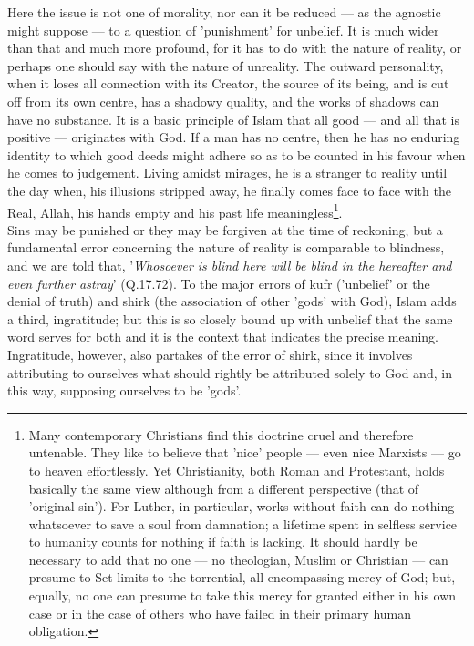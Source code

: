 \documentclass[11pt, b5paper, twoside]{book}
\begin{document}
Here the issue is not one of morality, nor can it be reduced --- as the agnostic might suppose --- to a 
question of 'punishment' for unbelief. It is much wider than that and much more profound, for it has 
to do with the nature of reality, or perhaps one should say with the nature of unreality. The outward 
personality, when it loses all connection with its Creator, the source of its being, and is cut off 
from its own centre, has a shadowy quality, and the works of shadows can have no substance. It is a 
basic principle of Islam that all good --- and all that is positive --- originates with God. If a man has 
no centre, then he has no enduring identity to which good deeds might adhere so as to be counted in 
his favour when he comes to judgement. Living amidst mirages, he is a stranger to reality until the 
day when, his illusions stripped away, he finally comes face to face with the Real, Allah, his hands 
empty and his past life meaningless\footnote{Many contemporary Christians find this doctrine cruel and therefore untenable. They like to believe 
that 'nice' people --- even nice Marxists --- go to heaven effortlessly. Yet Christianity, both Roman and 
Protestant, holds basically the same view although from a different perspective (that of 'original 
sin'). For Luther, in particular, works without faith can do nothing whatsoever to save a soul from 
damnation; a lifetime spent in selfless service to humanity counts for nothing if faith is lacking. 
It should hardly be necessary to add that no one --- no theologian, Muslim or Christian --- can presume 
to Set limits to the torrential, all-encompassing mercy of God; but, equally, no one can presume to 
take this mercy for granted either in his own case or in the case of others who have failed in their 
primary human obligation.}.\\

Sins may be punished or they may be forgiven at the time of reckoning, but a fundamental error 
concerning the nature of reality is comparable to blindness, and we are told that, '\emph{Whosoever is 
blind here will be blind in the hereafter and even further astray}' (Q.17.72). To the major errors of 
kufr ('unbelief' or the denial of truth) and shirk (the association of other 'gods' with God), Islam 
adds a third, ingratitude; but this is so closely bound up with unbelief that the same word serves 
for both and it is the context that indicates the precise meaning. Ingratitude, however, also 
partakes of the error of shirk, since it involves attributing to ourselves what should rightly be 
attributed solely to God and, in this way, supposing ourselves to be 'gods'. \\
\end{document}
